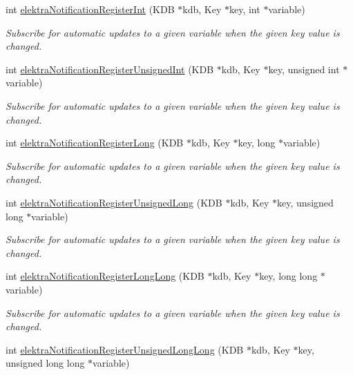 \begin{DoxyCompactItemize}
\item 
int \hyperlink{group__kdbnotification_ga362d557489c4199f6c765480a8a3cade}{elektra\+Notification\+Register\+Int} (K\+DB $\ast$kdb, Key $\ast$key, int $\ast$variable)
\begin{DoxyCompactList}\small\item\em Subscribe for automatic updates to a given variable when the given key value is changed. \end{DoxyCompactList}\item 
int \hyperlink{group__kdbnotification_ga940c1014f72e01b4145c418e87efa492}{elektra\+Notification\+Register\+Unsigned\+Int} (K\+DB $\ast$kdb, Key $\ast$key, unsigned int $\ast$variable)
\begin{DoxyCompactList}\small\item\em Subscribe for automatic updates to a given variable when the given key value is changed. \end{DoxyCompactList}\item 
int \hyperlink{group__kdbnotification_ga1130c58dc89f5838ca1c7d625e04bc92}{elektra\+Notification\+Register\+Long} (K\+DB $\ast$kdb, Key $\ast$key, long $\ast$variable)
\begin{DoxyCompactList}\small\item\em Subscribe for automatic updates to a given variable when the given key value is changed. \end{DoxyCompactList}\item 
int \hyperlink{group__kdbnotification_ga8ba57c05dcd561b266f3a32aa687d4ea}{elektra\+Notification\+Register\+Unsigned\+Long} (K\+DB $\ast$kdb, Key $\ast$key, unsigned long $\ast$variable)
\begin{DoxyCompactList}\small\item\em Subscribe for automatic updates to a given variable when the given key value is changed. \end{DoxyCompactList}\item 
int \hyperlink{group__kdbnotification_ga59593e7b3b2b5e32ec0d5cf611e3704c}{elektra\+Notification\+Register\+Long\+Long} (K\+DB $\ast$kdb, Key $\ast$key, long long $\ast$variable)
\begin{DoxyCompactList}\small\item\em Subscribe for automatic updates to a given variable when the given key value is changed. \end{DoxyCompactList}\item 
int \hyperlink{group__kdbnotification_ga69673c57ef694bb6d5d383eaf89750dd}{elektra\+Notification\+Register\+Unsigned\+Long\+Long} (K\+DB $\ast$kdb, Key $\ast$key, unsigned long long $\ast$variable)

\end{DoxyCompactItemize}
